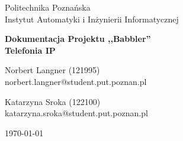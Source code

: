 \begin{titlepage}
	\centering
	{\Large Politechnika Poznańska\\
		Instytut Automatyki i Inżynierii Informatycznej\par}
	
	\vspace{3.5cm}
	{\LARGE\bfseries Dokumentacja Projektu ,,Babbler''\\
		Telefonia IP\par}
	\vspace{2cm}
	{\Large Norbert Langner (121995)\\
		norbert.langner@student.put.poznan.pl\par}
	\vspace{0.25cm}
	{\Large Katarzyna Sroka (122100)\\
		katarzyna.sroka@student.put.poznan.pl\par}
	
	\vfill
	
	{\large \today\par}
\end{titlepage}